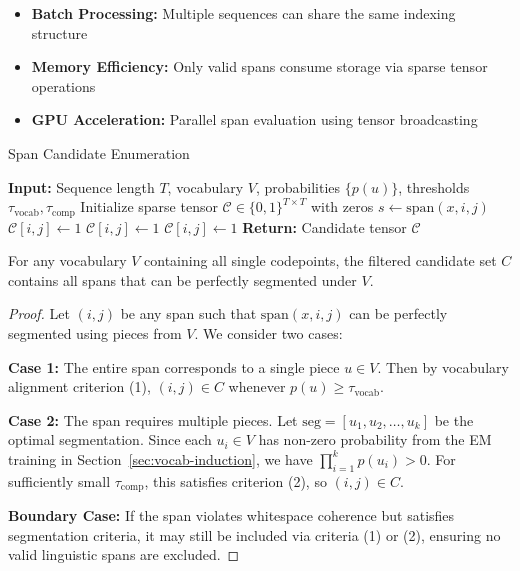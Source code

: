 \begin{itemize}
	\item \textbf{Batch Processing:} Multiple sequences can share the same indexing structure
	\item \textbf{Memory Efficiency:} Only valid spans consume storage via sparse tensor operations
	\item \textbf{GPU Acceleration:} Parallel span evaluation using tensor broadcasting
\end{itemize}

\begin{algorithm}[H]
	\caption{Span Candidate Enumeration}
	\label{alg:span-candidates}
	\begin{algorithmic}[1]
		\STATE \textbf{Input:} Sequence length \(T\), vocabulary \(V\), probabilities \(\{p(u)\}\), 
		\STATE \qquad thresholds \(\tau_{\text{vocab}}, \tau_{\text{comp}}\)
		\STATE Initialize sparse tensor \(\mathcal{C} \in \{0,1\}^{T \times T}\) with zeros
		\STATE \(s \leftarrow \text{span}(x, i, j)\) 
		\STATE \(\mathcal{C}[i,j] \leftarrow 1\)
		\STATE \(\mathcal{C}[i,j] \leftarrow 1\)
		\STATE \(\mathcal{C}[i,j] \leftarrow 1\)
		\ENDIF
		\ENDFOR
		\ENDFOR
		\STATE \textbf{Return:} Candidate tensor \(\mathcal{C}\)
	\end{algorithmic}
\end{algorithm}

\begin{proposition}
	For any vocabulary \(V\) containing all single codepoints, the filtered candidate set \(C\) contains all spans that can be perfectly segmented under \(V\).
\end{proposition}

\begin{proof}
	Let \((i,j)\) be any span such that \(\text{span}(x, i, j)\) can be perfectly segmented using pieces from \(V\). We consider two cases:
	
	\textbf{Case 1:} The entire span corresponds to a single piece \(u \in V\). Then by vocabulary alignment criterion (1), \((i,j) \in C\) whenever \(p(u) \geq \tau_{\text{vocab}}\).
	
	\textbf{Case 2:} The span requires multiple pieces. Let \(\text{seg} = [u_1, u_2, \ldots, u_k]\) be the optimal segmentation. Since each \(u_i \in V\) has non-zero probability from the EM training in Section~\ref{sec:vocab-induction}, we have \(\prod_{i=1}^k p(u_i) > 0\). For sufficiently small \(\tau_{\text{comp}}\), this satisfies criterion (2), so \((i,j) \in C\).
	
	\textbf{Boundary Case:} If the span violates whitespace coherence but satisfies segmentation criteria, it may still be included via criteria (1) or (2), ensuring no valid linguistic spans are excluded.
\end{proof}

